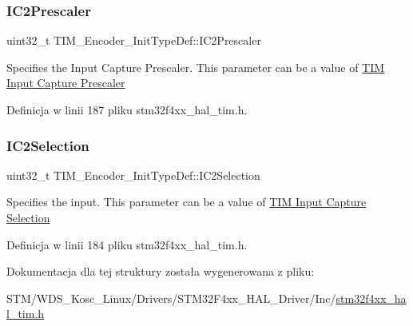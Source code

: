 \subsubsection{\texorpdfstring{I\+C2\+Prescaler}{IC2Prescaler}}
{\footnotesize\ttfamily uint32\+\_\+t T\+I\+M\+\_\+\+Encoder\+\_\+\+Init\+Type\+Def\+::\+I\+C2\+Prescaler}

Specifies the Input Capture Prescaler. This parameter can be a value of \hyperlink{group___t_i_m___input___capture___prescaler}{T\+IM Input Capture Prescaler} 

Definicja w linii 187 pliku stm32f4xx\+\_\+hal\+\_\+tim.\+h.

\mbox{\label{struct_t_i_m___encoder___init_type_def_a84a39a8667f296b4b3fbe1a0add58396}} 
\subsubsection{\texorpdfstring{I\+C2\+Selection}{IC2Selection}}
{\footnotesize\ttfamily uint32\+\_\+t T\+I\+M\+\_\+\+Encoder\+\_\+\+Init\+Type\+Def\+::\+I\+C2\+Selection}

Specifies the input. This parameter can be a value of \hyperlink{group___t_i_m___input___capture___selection}{T\+IM Input Capture Selection} 

Definicja w linii 184 pliku stm32f4xx\+\_\+hal\+\_\+tim.\+h.



Dokumentacja dla tej struktury została wygenerowana z pliku\+:\begin{DoxyCompactItemize}
\item 
S\+T\+M/\+W\+D\+S\+\_\+\+Kosc\+\_\+\+Linux/\+Drivers/\+S\+T\+M32\+F4xx\+\_\+\+H\+A\+L\+\_\+\+Driver/\+Inc/\hyperlink{stm32f4xx__hal__tim_8h}{stm32f4xx\+\_\+hal\+\_\+tim.\+h}\end{DoxyCompactItemize}
